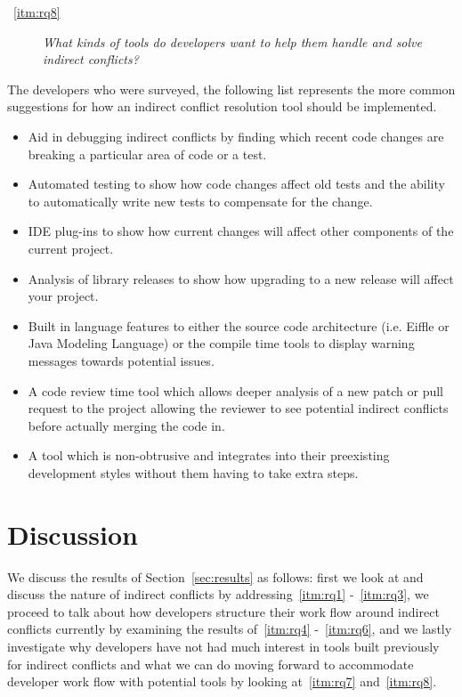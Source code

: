 \documentclass[conference]{IEEEtran}
\begin{document}
\begin{description}
	\item[~\ref{itm:rq8}] \textit{What kinds of tools do developers want to help them handle and solve indirect conflicts?}
\end{description}

The developers who were surveyed, the following list represents the more common suggestions for how an indirect conflict
resolution tool should be implemented.

\begin{itemize}
	\item Aid in debugging indirect conflicts by finding which recent code changes are breaking a particular area of code or a test.
	\item Automated testing to show how code changes affect old tests and the ability to automatically write new tests to compensate for the change.
	\item IDE plug-ins to show how current changes will affect other components of the current project.
	\item Analysis of library releases to show how upgrading to a new release will affect your project.
	\item Built in language features to either the source code architecture (i.e. Eiffle or Java Modeling Language) or the compile time tools to display
				warning messages towards potential issues.
	\item A code review time tool which allows deeper analysis of a new patch or pull request to the project allowing the reviewer to see potential 
				indirect conflicts before actually merging the code in.
	\item A tool which is non-obtrusive and integrates into their preexisting development styles without them having to take extra steps.
\end{itemize}

\section{Discussion}
\label{sec:disc}

We discuss the results of Section~\ref{sec:results} as follows: first we look at and discuss the nature of indirect conflicts by addressing~\ref{itm:rq1} 
-~\ref{itm:rq3}, we proceed to talk about how developers structure their work flow around indirect conflicts currently by
examining the results of~\ref{itm:rq4} -~\ref{itm:rq6}, and we lastly investigate why developers have not had much interest in tools built previously
for indirect conflicts and what we can do moving forward to accommodate developer work flow with potential tools by looking at~\ref{itm:rq7} 
and~\ref{itm:rq8}.
\end{document}
